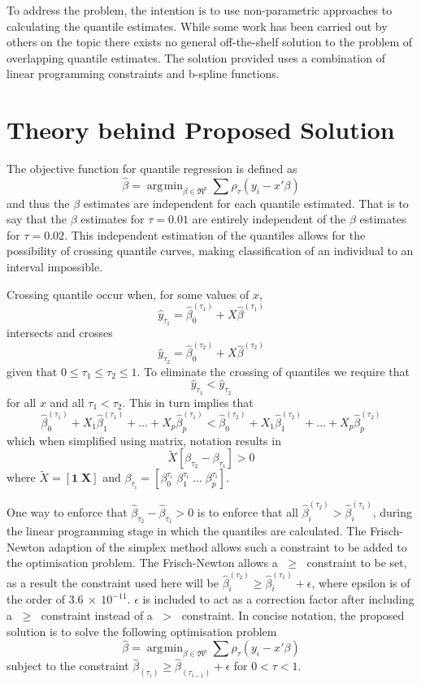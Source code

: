 \documentclass[12pt,a4paper]{report}
\DeclareMathOperator*{\argmin}{\arg\!\min}
\begin{document}
To address the problem, the intention is to use non-parametric approaches to calculating the quantile estimates. While some work has been carried out by others on the topic there exists no general off-the-shelf solution to the problem of overlapping quantile estimates. The solution provided uses a combination of linear programming constraints and b-spline functions.
\vspace{2mm}

\section{Theory behind Proposed Solution}
The objective function for quantile regression is defined as
$$ \hat{\beta}=\argmin_{\beta\in\Re^{p}}\sum\rho_{\tau}(y_{i}-x'\beta)$$
and thus the $\beta$ estimates are independent for each quantile estimated. That is to say that the $\beta$ estimates for $\tau=0.01$ are entirely independent of the $\beta$ estimates for $\tau=0.02$. This independent estimation of the quantiles allows for the possibility of crossing quantile curves, making classification of an individual to an interval impossible.
\vspace{2mm}

Crossing quantile occur when, for some values of $x$,
$$ \hat{y}_{\tau_{1}} = \hat{\beta}_{0}^{(\tau_{1})} + X \hat{\beta}^{(\tau_{1})} $$
intersects and crosses
$$ \hat{y}_{\tau_{2}} = \hat{\beta}_{0}^{(\tau_{2})} + X \hat{\beta}^{(\tau_{2})} $$
given that $0\leq\tau_{1}\leq\tau_{2}\leq1$. To eliminate the crossing of quantiles we require that
$$\hat{y}_{\tau_{1}} < \hat{y}_{\tau_{2}}$$
for all $x$ and all $\tau_{1}<\tau_{2}$. This in turn implies that
$$ \hat{\beta}_{0}^{(\tau_{1})} + X_{1} \hat{\beta}_{1}^{(\tau_{1})} + \ldots + X_{p} \hat{\beta}_{p}^{(\tau_{1})} < \hat{\beta}_{0}^{(\tau_{2})} + X_{1} \hat{\beta}_{1}^{(\tau_{2})} + \ldots + X_{p} \hat{\beta}_{p}^{(\tau_{2})} $$
which when simplified using matrix, notation results in
$$\tilde{X}[\beta_{\tau_{2}}-\beta_{\tau_{1}}]>0$$
where $\tilde{X}=[\mathbf{1} \; \mathbf{X}]$ and $\beta_{\tau_{i}}=[\beta_{0}^{\tau_{i}} \; \beta_{1}^{\tau_{i}} \; \ldots \; \beta_{p}^{\tau_{i}}]$.
\vspace{2mm}

One way to enforce that $\hat{\beta}_{\tau_{2}}-\hat{\beta}_{\tau_{1}}>0$ is to enforce that all $\hat{\beta}_{i}^{(\tau_{2})}>\hat{\beta}_{i}^{(\tau_{1})}$, during the linear programming stage in which the quantiles are calculated. The Frisch-Newton adaption of the simplex method allows such a constraint to be added to the optimisation problem. The Frisch-Newton allows a $\;\geq\;$ constraint to be set, as a result the constraint used here will be $\hat{\beta}_{i}^{(\tau_{2})}\geq\hat{\beta}_{i}^{(\tau_{1})}+\epsilon$, where epsilon is of the order of $3.6\:\times\:10^{-11}$. $\epsilon$ is included to act as a correction factor after including a $\;\geq\;$ constraint instead of a $\;>\;$ constraint.  In concise notation, the proposed solution is to solve the following optimisation problem
$$\hat{\beta}=\argmin_{\beta\in\Re^{p}}\sum\rho_{\tau}(y_{i}-x'\beta)$$
subject to the constraint $\hat{\beta}_{(\tau_{i})}\geq\hat{\beta}_{(\tau_{i-1})}+\epsilon$ for $0<\tau<1$.
\vspace{2mm}
\end{document}
